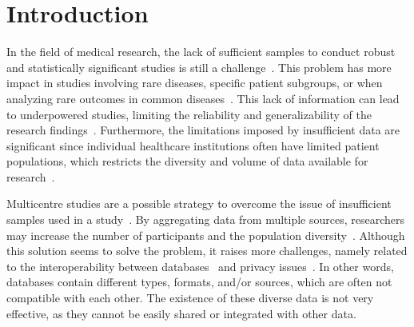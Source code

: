 \chapter{Introduction}
\label{chapter:Introduction}

%
% 
%


In the field of medical research, the lack of sufficient samples to conduct robust and statistically significant studies is still a challenge~\cite{rogers2021clinical}. This problem has more impact in studies involving rare diseases, specific patient subgroups, or when analyzing rare outcomes in common diseases~\cite{topaloglu2018using}. This lack of information can lead to underpowered studies, limiting the reliability and generalizability of the research findings~\cite{lombardo2023electronic}. Furthermore, the limitations imposed by insufficient data are significant since individual healthcare institutions often have limited patient populations, which restricts the diversity and volume of data available for research~\cite{rogers2021clinical,lombardo2023electronic}.

Multicentre studies are a possible strategy to overcome the issue of insufficient samples used in a study~\cite{almeida2021methodology}. By aggregating data from multiple sources, researchers may increase the number of participants and the population diversity~\cite{kaelber2008research}. Although this solution seems to solve the problem, it raises more challenges, namely related to the interoperability between databases~\cite{pereira2023querying} and privacy issues~\cite{almeida2022secure}. In other words, databases contain different types, formats, and/or sources, which are often not compatible with each other. The existence of these diverse data is not very effective, as they cannot be easily shared or integrated with other data.

